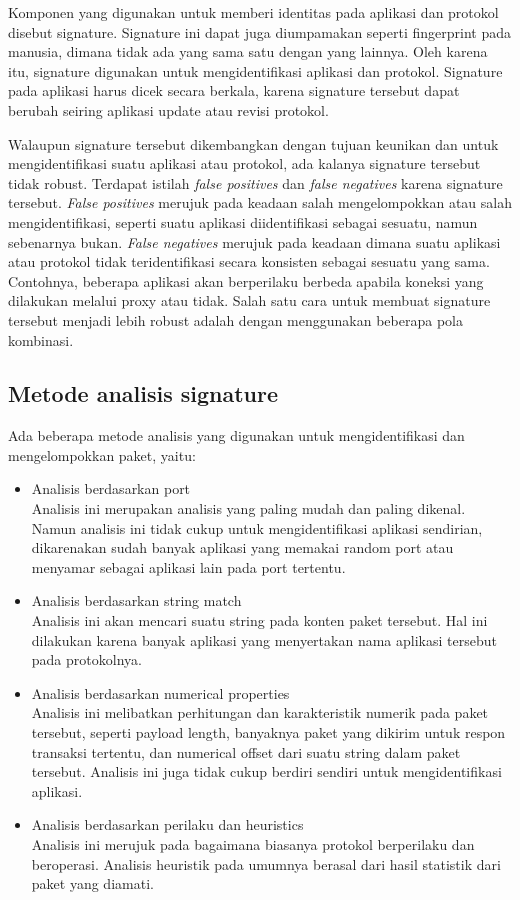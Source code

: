 Komponen yang digunakan untuk memberi identitas pada aplikasi dan protokol disebut signature. Signature ini dapat juga diumpamakan seperti fingerprint pada manusia, dimana tidak ada yang sama satu dengan yang lainnya. Oleh karena itu, signature digunakan untuk mengidentifikasi aplikasi dan protokol. Signature pada aplikasi harus dicek secara berkala, karena signature tersebut dapat berubah seiring aplikasi update atau revisi protokol.

Walaupun signature tersebut dikembangkan dengan tujuan keunikan dan untuk mengidentifikasi suatu aplikasi atau protokol, ada kalanya signature tersebut tidak robust. Terdapat istilah \textit{false positives} dan \textit{false negatives} karena signature tersebut. \textit{False positives} merujuk pada keadaan salah mengelompokkan atau salah mengidentifikasi, seperti suatu aplikasi diidentifikasi sebagai sesuatu, namun sebenarnya bukan. \textit{False negatives} merujuk pada keadaan dimana suatu aplikasi atau protokol tidak teridentifikasi secara konsisten sebagai sesuatu yang sama. Contohnya, beberapa aplikasi akan berperilaku berbeda apabila koneksi yang dilakukan melalui proxy atau tidak. Salah satu cara untuk membuat signature tersebut menjadi lebih robust adalah dengan menggunakan beberapa pola kombinasi.

\subsection{Metode analisis signature}
Ada beberapa metode analisis yang digunakan untuk mengidentifikasi dan mengelompokkan paket, yaitu:
\begin{itemize}
	\item Analisis berdasarkan port\\
	Analisis ini merupakan analisis yang paling mudah dan paling dikenal. Namun analisis ini tidak cukup untuk mengidentifikasi aplikasi sendirian, dikarenakan sudah banyak aplikasi yang memakai random port atau menyamar sebagai aplikasi lain pada port tertentu.
	\item Analisis berdasarkan string match\\
	Analisis ini akan mencari suatu string pada konten paket tersebut. Hal ini dilakukan karena banyak aplikasi yang menyertakan nama aplikasi tersebut pada protokolnya. 
	\item Analisis berdasarkan numerical properties\\
	Analisis ini melibatkan perhitungan dan karakteristik numerik pada paket tersebut, seperti payload length, banyaknya paket yang dikirim untuk respon transaksi tertentu, dan numerical offset dari suatu string dalam paket tersebut. Analisis ini juga tidak cukup berdiri sendiri untuk mengidentifikasi aplikasi.
	\item Analisis berdasarkan perilaku dan heuristics\\
	Analisis ini merujuk pada bagaimana biasanya protokol berperilaku dan beroperasi. Analisis heuristik pada umumnya berasal dari hasil statistik dari paket yang diamati.
\end{itemize}

